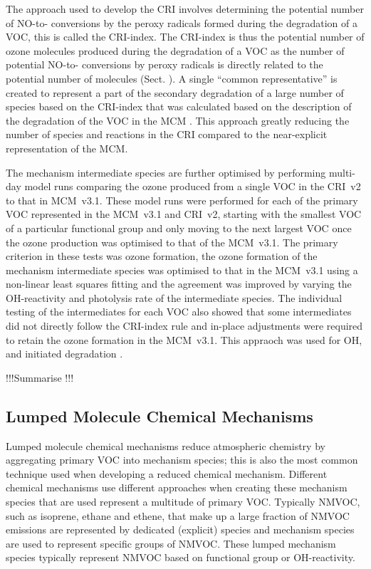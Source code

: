 The approach used to develop the CRI involves determining the potential number of NO-to- conversions by the peroxy radicals formed during the degradation of a VOC, this is called the CRI-index.
The CRI-index is thus the potential number of ozone molecules produced during the degradation of a VOC as the number of potential NO-to- conversions by peroxy radicals is directly related to the potential number of  molecules (Sect. ).
A single ``common representative'' is created to represent a part of the secondary degradation of a large number of species based on the CRI-index that was calculated based on the description of the degradation of the VOC in the MCM \citep{Jenkin:2008}.
This approach greatly reducing the number of species and reactions in the CRI compared to the near-explicit representation of the MCM.

The mechanism intermediate species are further optimised by performing multi-day model runs comparing the ozone produced from a single VOC in the CRI~v2 to that in MCM~v3.1.
These model runs were performed for each of the primary VOC represented in the MCM~v3.1 and CRI~v2, starting with the smallest VOC of a particular functional group and only moving to the next largest VOC once the ozone production was optimised to that of the MCM~v3.1.
The primary criterion in these tests was ozone formation, the ozone formation of the mechanism intermediate species was optimised to that in the MCM~v3.1 using a non-linear least squares fitting and the agreement was improved by varying the OH-reactivity and photolysis rate of the intermediate species.
The individual testing of the intermediates for each VOC also showed that some intermediates did not directly follow the CRI-index rule and in-place adjustments were required to retain the ozone formation in the MCM~v3.1.
This appraoch was used for OH,  and  initiated degradation \citep{Jenkin:2008}.

!!!Summarise \citet{Watson:2008}!!!

\subsection{Lumped Molecule Chemical Mechanisms} \label{ss:lumped_molecule}
Lumped molecule chemical mechanisms reduce atmospheric chemistry by aggregating primary VOC into mechanism species; this is also the most common technique used when developing a reduced chemical mechanism.
Different chemical mechanisms use different approaches when creating these mechanism species that are used represent a multitude of primary VOC.
Typically NMVOC, such as isoprene, ethane and ethene, that make up a large fraction of NMVOC emissions are represented by dedicated (explicit) species and mechanism species are used to represent specific groups of NMVOC.
These lumped mechanism species typically represent NMVOC based on functional group or OH-reactivity.

